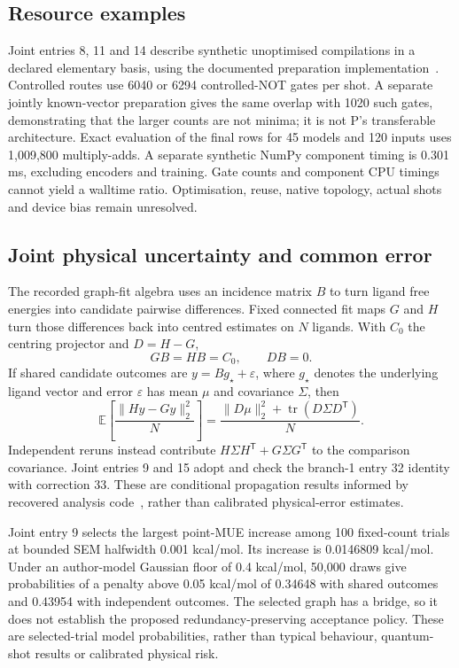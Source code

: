 \documentclass{article}
\begin{document}
\subsection{Resource examples}

Joint entries 8, 11 and 14 describe synthetic unoptimised compilations in a declared elementary basis, using the documented preparation implementation~\cite{preparation}. Controlled routes use 6040 or 6294 controlled-NOT gates per shot. A separate jointly known-vector preparation gives the same overlap with 1020 such gates, demonstrating that the larger counts are not minima; it is not P's transferable architecture. Exact evaluation of the final rows for 45 models and 120 inputs uses 1,009,800 multiply-adds. A separate synthetic NumPy component timing is 0.301 ms, excluding encoders and training. Gate counts and component CPU timings cannot yield a walltime ratio. Optimisation, reuse, native topology, actual shots and device bias remain unresolved.

\subsection{Joint physical uncertainty and common error}

The recorded graph-fit algebra uses an incidence matrix \(B\) to turn ligand free energies into candidate pairwise differences. Fixed connected fit maps \(G\) and \(H\) turn those differences back into centred estimates on \(N\) ligands. With \(C_0\) the centring projector and \(D=H-G\),
\[
GB=HB=C_0,\qquad DB=0.
\]
If shared candidate outcomes are \(y=Bg_\star+\varepsilon\), where \(g_\star\) denotes the underlying ligand vector and error \(\varepsilon\) has mean \(\mu\) and covariance \(\Sigma\), then
\[
\mathbb E\!\left[\frac{\|Hy-Gy\|_2^2}{N}\right]
=\frac{\|D\mu\|_2^2+\operatorname{tr}(D\Sigma D^{\mathsf T})}{N}.
\]
Independent reruns instead contribute \(H\Sigma H^{\mathsf T}+G\Sigma G^{\mathsf T}\) to the comparison covariance. Joint entries 9 and 15 adopt and check the branch-1 entry 32 identity with correction 33. These are conditional propagation results informed by recovered analysis code~\cite{analysis}, rather than calibrated physical-error estimates.

Joint entry 9 selects the largest point-MUE increase among 100 fixed-count trials at bounded SEM halfwidth 0.001 kcal/mol. Its increase is 0.0146809 kcal/mol. Under an author-model Gaussian floor of 0.4 kcal/mol, 50,000 draws give probabilities of a penalty above 0.05 kcal/mol of 0.34648 with shared outcomes and 0.43954 with independent outcomes. The selected graph has a bridge, so it does not establish the proposed redundancy-preserving acceptance policy. These are selected-trial model probabilities, rather than typical behaviour, quantum-shot results or calibrated physical risk.
\end{document}
